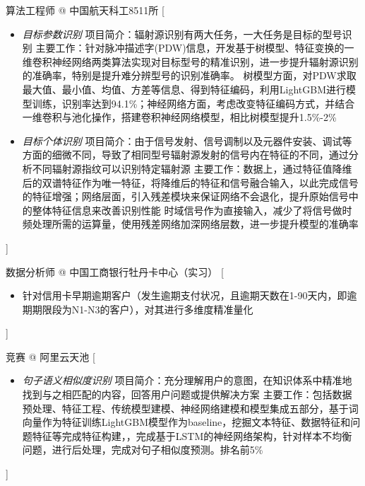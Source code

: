\documentclass[zh]{resume}
\begin{document}
{\begin{experiences}
    \separator{0.5ex}
    {算法工程师 @ 中国航天科工8511所}%
    [\begin{itemize}
            \item \emph{目标参数识别}
                  \subitem 项目简介：辐射源识别有两大任务，一大任务是目标的型号识别
                  \subitem 主要工作：针对脉冲描述字(PDW)信息，开发基于树模型、特征变换的一维卷积神经网络两类算法实现对目标型号的精准识别，进一步提升辐射源识别的准确率，特别是提升难分辨型号的识别准确率。
                  \subitem 树模型方面，对PDW求取最大值、最小值、均值、方差等信息、得到特征编码，利用LightGBM进行模型训练，识别率达到94.1\%；神经网络方面，考虑改变特征编码方式，并结合一维卷积与池化操作，搭建卷积神经网络模型，相比树模型提升1.5\%-2\%
            \item \emph{目标个体识别}
                  \subitem 项目简介：由于信号发射、信号调制以及元器件安装、调试等方面的细微不同，导致了相同型号辐射源发射的信号内在特征的不同，通过分析不同辐射源指纹可以识别特定辐射源
                  \subitem 主要工作：数据上，通过特征值降维后的双谱特征作为唯一特征，将降维后的特征和信号融合输入，以此完成信号的特征增强；网络层面，引入残差模块来保证网络不会退化，提升原始信号中的整体特征信息来改善识别性能
                  \subitem 时域信号作为直接输入，减少了将信号做时频处理所需的运算量，使用残差网络加深网络层数，进一步提升模型的准确率
        \end{itemize}]

    \separator{0.5ex}
    {数据分析师 @ 中国工商银行牡丹卡中心（实习）}%
    [\begin{itemize}
            \item 针对信用卡早期逾期客户（发生逾期支付状况，且逾期天数在1-90天内，即逾期期限段为N1-N3的客户），对其进行多维度精准量化
        \end{itemize}]

    \separator{0.5ex}
    {竞赛 @ 阿里云天池}%
    [\begin{itemize}
            \item \emph{句子语义相似度识别}
                  \subitem 项目简介：充分理解用户的意图，在知识体系中精准地找到与之相匹配的内容，回答用户问题或提供解决方案
                  \subitem 主要工作：包括数据预处理、特征工程、传统模型建模、神经网络建模和模型集成五部分，基于词向量作为特征训练LightGBM模型作为baseline，挖掘文本特征、数据特征和问题特征等完成特征构建，，完成基于LSTM的神经网络架构，针对样本不均衡问题，进行后处理，完成对句子相似度预测。排名前5\%
        \end{itemize}]


\end{experiences}}
\end{document}
